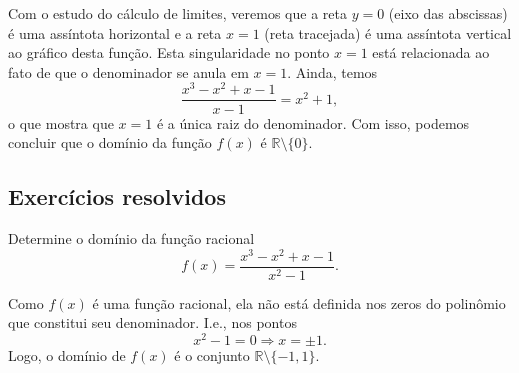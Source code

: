 Com o estudo do cálculo de limites, veremos que a reta $y = 0$ (eixo das abscissas) é uma assíntota horizontal e a reta $x=1$ (reta tracejada) é uma assíntota vertical ao gráfico desta função. Esta singularidade no ponto $x=1$ está relacionada ao fato de que o denominador se anula em $x=1$. Ainda, temos
\begin{equation}
  \frac{x^3 - x^2 + x - 1}{x-1} = x^2 + 1,
\end{equation}
o que mostra que $x=1$ é a única raiz do denominador. Com isso, podemos concluir que o domínio da função $f(x)$ é $\mathbb{R}\setminus\{0\}$.


\subsection*{Exercícios resolvidos}

\begin{exer}
  Determine o domínio da função racional
  \begin{equation}
    f(x) = \frac{x^3-x^2+x-1}{x^2-1}.
  \end{equation}
\end{exer}
\begin{resol}
  Como $f(x)$ é uma função racional, ela não está definida nos zeros do polinômio que constitui seu denominador. I.e., nos pontos
  \begin{equation}
    x^2-1=0\Rightarrow x = \pm 1.
  \end{equation}
  Logo, o domínio de $f(x)$ é o conjunto $\mathbb{R}\setminus\{-1, 1\}$.
\end{resol}

